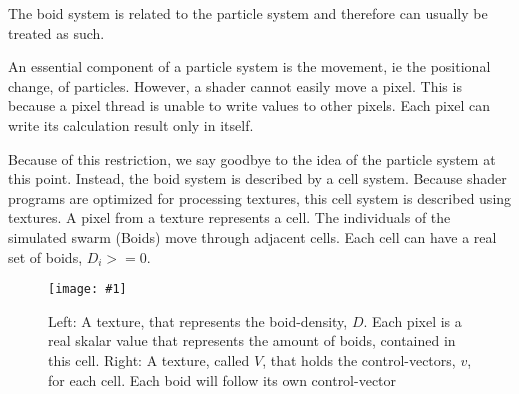 \documentclass[a4paper, 10pt, journal]{wissarbIEEE}      %
\newcommand{\bild}[3]{
\begin{figure}[h]
\centering
  \texttt{[image: \#1]}
  \caption{#3}
  \label{#1}
\end{figure}}
\begin{document}
The boid system is related to the particle system \cite{Reynolds87flocks} and therefore can usually be treated as such. 
 

An essential component of a particle system is the movement, ie the positional change, of particles. However, a shader cannot easily move a pixel. This is because a pixel thread is unable to write values to other pixels. Each pixel can write its calculation result only in itself.



Because of this restriction, we say goodbye to the idea of the particle system at this point. Instead, the boid system is described by a cell system. Because shader programs are optimized for processing textures, this cell system is described using textures. A pixel from a texture represents a cell. The individuals of the simulated swarm (Boids) move through adjacent cells. Each cell can have a real set of boids, $D_i>=0$.



\bild{bilder/Schwarmdarstellung}{8.5cm}{Left: A texture, that represents the boid-density, $D$. Each pixel is a real skalar value that represents the amount of boids, contained in this cell. Right: A texture, called $V$, that holds the control-vectors, $v$, for each cell. Each boid will follow its own control-vector}

\end{document}

